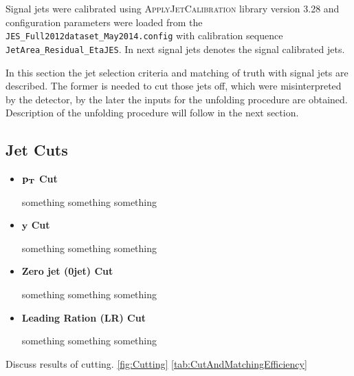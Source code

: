 Signal jets were calibrated using \textsc{ApplyJetCalibration} library version
3.28 and configuration parameters were loaded from the
\texttt{JES\_Full2012dataset\_May2014.config} with calibration sequence
\texttt{JetArea\_Residual\_EtaJES}. In next signal jets denotes the signal
calibrated jets.

In this section the jet selection criteria and matching of truth with signal
jets are described. The former is needed to cut those jets off, which were
misinterpreted by the detector, by the later the inputs for the unfolding
procedure are obtained. Description of the unfolding procedure will follow in
the next section.

\subsection{Jet Cuts}

\begin{itemize}
  \item \textbf{$\mathbf{p_{T}}$ Cut}

    something something something
  \item \textbf{$\mathbf{y}$ Cut}
    
    something something something
  \item \textbf{Zero jet (0jet) Cut}

    something something something
  \item \textbf{Leading Ration (LR) Cut}

    something something something
\end{itemize}

Discuss results of cutting. 
\ref{fig:Cutting}
\ref{tab:CutAndMatchingEfficiency}

